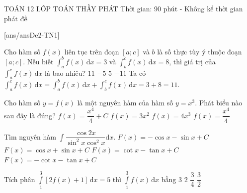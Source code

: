 \begin{name}
	{\tenchude}
	{TOÁN 12}
	{LỚP TOÁN THẦY PHÁT}
	{Thời gian: 90 phút - Không kể thời gian phát đề}
\end{name}
[ans/ansDe2-TN1]
\begin{ex}%
Cho hàm số $f(x)$ liên tục trên đoạn $[a;c]$ và $b$ là số thực tùy ý thuộc đoạn $[a;c]$. Nếu biết $\displaystyle\int_a^b f(x) \mathrm{\,d}x = 3$ và $\displaystyle\int_b^c f(x) \mathrm{\,d}x = 8$, thì giá trị của $\displaystyle\int_a^c f(x) \mathrm{\,d}x$ là bao nhiêu?
\choice
{\True $11$}
{$-5$}
{$5$}
{$-11$}
\loigiai
{
Ta có $\displaystyle\int_a^c f(x) \mathrm{\,d}x = \displaystyle\int_a^b f(x) \mathrm{\,d}x + \displaystyle\int_b^c f(x) \mathrm{\,d}x = 3 + 8 = 11$.
}
\end{ex}

\begin{ex}%
Cho hàm số $y = f(x)$ là một nguyên hàm của hàm số $y = x^3$. Phát biểu nào sau đây là đúng?
\choice
{$f(x) = \dfrac{x^4}{4} + C$}
{$f(x) = 3x^2$}
{$f(x) = 4x^3$}
{\True $f(x) = \dfrac{x^4}{4}$}
\end{ex}

\begin{ex}%
Tìm nguyên hàm $\displaystyle\int \dfrac{\cos 2x}{\sin^2 x \cos^2 x} \mathrm{d}x$.
\choice
{ $F(x) = -\cos x - \sin x + C$ }
{ $F(x) = \cos x + \sin x + C$ }
{ $F(x) = \cot x - \tan x + C$ }
{\True $F(x) = -\cot x - \tan x + C$ }
\end{ex}

\begin{ex}%
Tích phân $\displaystyle\int\limits_{1}^{3}\left[2f(x)+1\right]\mathrm{\,d}x=5$ thì $\displaystyle\int\limits_{1}^{3} f(x)\mathrm{\,d}x$ bằng
\choice
{$3$}
{$2$}
{$\dfrac{3}{4}$}
{\True$\dfrac{3}{2}$}
\end{ex}

